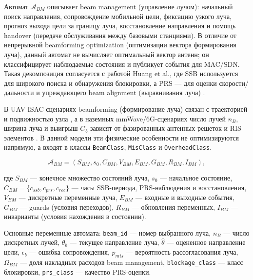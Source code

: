 \documentclass[12pt,a4paper]{article}
\begin{document}
Автомат $\mathcal{A}_{BM}$ описывает beam management (управление лучом): начальный поиск направления, сопровождение мобильной цели, фиксацию узкого луча, прогноз выхода цели за границу луча, восстановление направления и помощь handover (передаче обслуживания между базовыми станциями). В отличие от непрерывной beamforming optimization (оптимизации вектора формирования луча), данный автомат не вычисляет оптимальный вектор антенн; он классифицирует наблюдаемые состояния и публикует события для MAC/SDN. Такая декомпозиция согласуется с работой Huang et al., где SSB используется для широкого поиска и обнаружения блокировки, а PRS --- для оценки скорости/дальности и упреждающего beam alignment (выравнивания луча) \cite{huang2026beam}.

В UAV-ISAC сценариях beamforming (формирование луча) связан с траекторией и подвижностью узла \cite{ahmed2025uav,chen2026trajectory}, а в наземных mmWave/6G-сценариях число лучей $n_B$, ширина луча и выигрыш $G_b$ зависят от фазированных антенных решеток и RIS-элементов \cite{wu2026ris,chen2026array}. В данной модели эти физические особенности не оптимизируются напрямую, а входят в классы \texttt{BeamClass}, \texttt{MisClass} и \texttt{OverheadClass}.

\begin{equation}
\mathcal{A}_{BM}=
(S_{BM},s_0,C_{BM},V_{BM},E_{BM},G_{BM},R_{BM},I_{BM}),
\end{equation}

где $S_{BM}$ --- конечное множество состояний луча, $s_0$ --- начальное состояние, $C_{BM}=\{c_{ssb},c_{prs},c_{rec}\}$ --- часы SSB-периода, PRS-наблюдения и восстановления, $V_{BM}$ --- дискретные переменные луча, $E_{BM}$ --- входные и выходные события, $G_{BM}$ --- guards (условия переходов), $R_{BM}$ --- обновления переменных, $I_{BM}$ --- инварианты (условия нахождения в состоянии).

Основные переменные автомата: \texttt{beam\_id} --- номер выбранного луча, $n_B$ --- число дискретных лучей, $\theta_b$ --- текущее направление луча, $\hat{\theta}$ --- оцененное направление цели, $\epsilon_b$ --- ошибка сопровождения, $p_{mis}$ --- вероятность рассогласования луча, $\Omega_{BM}$ --- доля накладных расходов beam management, \texttt{blockage\_class} --- класс блокировки, \texttt{prs\_class} --- качество PRS-оценки.
\end{document}
